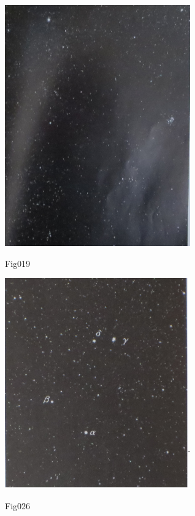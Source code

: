 \documentclass{jarticle}
\begin{document}
\begin{minipage}{5cm}
\includegraphics[width=8cm, clip]{fig019.jpg}
\begin{center}
Fig019
\end{center}
\end{minipage}


\begin{minipage}{5cm}
\includegraphics[width=8cm, clip]{fig026.jpg}
\begin{center}
Fig026
\end{center}
\end{minipage}
\end{document}
